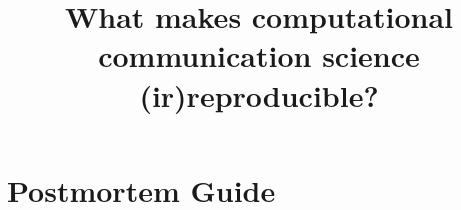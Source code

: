 \documentclass{ccr}
\title{What makes computational communication science (ir)reproducible?}
\begin{document}
\maketitle

\newpage




\printbibliography

\appendix
\section{Postmortem Guide}
\label{sec:postmortem}


\end{document}
